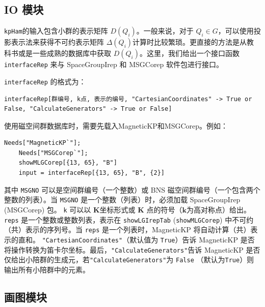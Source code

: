\documentclass[titlepage,a4paper,12pt,AutoFakeBold]{article}
\begin{document}
\subsection{IO 模块}

\lstinline!kpHam!的输入包含小群的表示矩阵 $D(Q_i)$。一般来说，对于 $Q_i\in G$，可以使用投影表示法来获得不可约表示矩阵 $\Delta(Q_i)$计算时比较繁琐。更直接的方法是从教科书或是一些成熟的数据库中获取 $D(Q_i)$。这里，我们给出一个接口函数 \lstinline|interfaceRep| 来与 \textsf{SpaceGroupIrep} 和 \textsf{MSGCorep} 软件包进行接口。

\lstinline|interfaceRep| 的格式为：
\begin{lstlisting}[backgroundcolor={\color{yellow!5!white}},mathescape=true]
	interfaceRep[群编号, k点, 表示的编号, "CartesianCoordinates" -> True or False, "CalculateGenerators" -> True or False]
\end{lstlisting}
使用磁空间群数据库时，需要先载入\textsf{MagneticKP}和\textsf{MSGCorep}。例如：
\begin{lstlisting}[backgroundcolor={\color{yellow!5!white}},mathescape=true]
	Needs["MagneticKP`"];
	Needs["MSGCorep`"];
	showMLGCorep[{13, 65}, "B"]
	input = interfaceRep[{13, 65}, "B", {2}]
\end{lstlisting}
其中 \lstinline|MSGNO| 可以是空间群编号（一个整数）或 BNS 磁空间群编号（一个包含两个整数的列表）。当 \lstinline|MSGNO| 是一个整数（列表）时，必须加载 \textsf{SpaceGroupIrep} (\textsf{MSGCorep}) 包。 \lstinline|k| 可以以 $\boldsymbol{K}$坐标形式或 $\boldsymbol{K}$ 点的符号（$\boldsymbol{k}$为高对称点）给出。 \lstinline|reps| 是一个整数或整数列表，表示在 \lstinline|showLGIrepTab| (\lstinline|showMLGCorep|) 中不可约（共）表示的序列号。当 \lstinline|reps| 是一个列表时，\textsf{MagneticKP} 将自动计算（共）表示的直和。 \lstinline|"CartesianCoordinates"|（默认值为 \lstinline|True|）告诉 \textsf{MagneticKP} 是否将操作转换为笛卡尔坐标。最后，\lstinline|"CalculateGenerators"|告诉 \textsf{MagneticKP} 是否仅给出小陪群的生成元，若\lstinline|"CalculateGenerators"|为 \lstinline|False| （默认为\lstinline|True|）则输出所有小陪群中的元素。

\subsection{画图模块}
\end{document}
